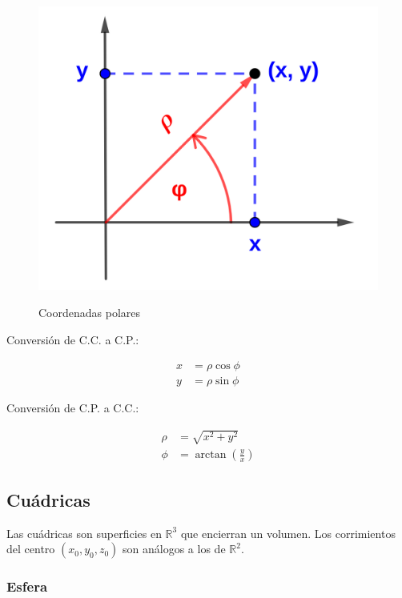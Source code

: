 \documentclass{article}
\renewcommand{\Bbb}{\mathbb}
\begin{document}
\begin{figure}[ht]
\caption{Coordenadas polares}
\includegraphics[scale=1.0]{img/teo_fig003_polares.png}
\centering
\label{fig:polares}
\end{figure}

Conversión de C.C. a C.P.:

\begin{subequations}
\begin{align}
x & = \rho \cos \phi \\
y & = \rho \sin \phi
\end{align}
\end{subequations}

Conversión de C.P. a C.C.:

\begin{subequations}
\begin{align}
\rho & = \sqrt{x^2 + y^2} \\
\phi & = \arctan \left( \frac{y}{x} \right)
\end{align}
\end{subequations}

\subsection{Cuádricas}

Las cuádricas son superficies en $\Bbb R^3$ que encierran un volumen. Los corrimientos del centro $(x_0, y_0, z_0)$ son análogos a los de $\Bbb R^2$.

\subsubsection{Esfera}
\end{document}
